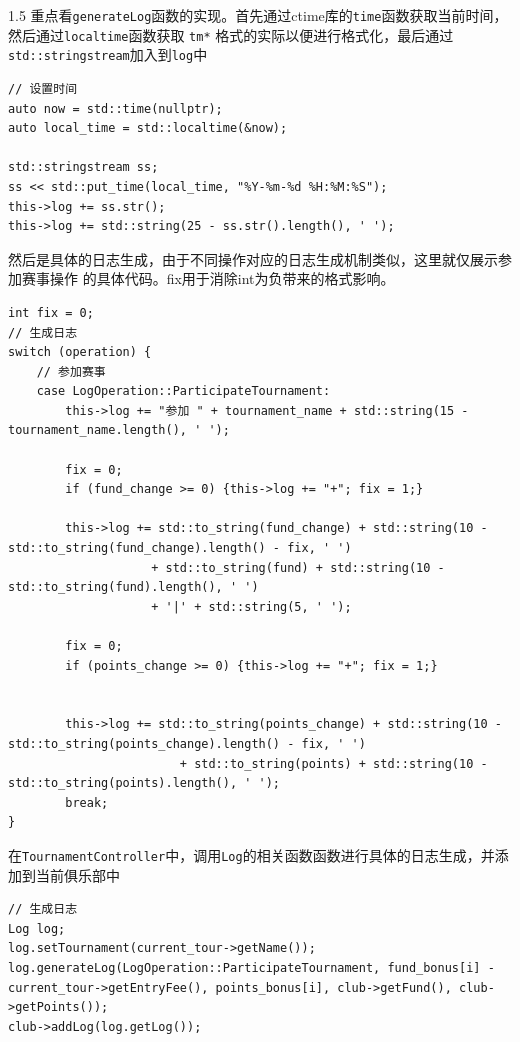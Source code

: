 \documentclass[a4paper]{article}
\begin{document}
\begin{spacing}{1.5}
    重点看\verb|generateLog|函数的实现。首先通过ctime库的\verb|time|函数获取当前时间，然后通过\verb|localtime|函数获取
    \verb|tm*| 格式的实际以便进行格式化，最后通过\verb|std::stringstream|加入到\verb|log|中

    \begin{lstlisting}[caption=时间戳生成]
// 设置时间
auto now = std::time(nullptr);
auto local_time = std::localtime(&now);

std::stringstream ss;
ss << std::put_time(local_time, "%Y-%m-%d %H:%M:%S");
this->log += ss.str();
this->log += std::string(25 - ss.str().length(), ' ');
    \end{lstlisting}

    然后是具体的日志生成，由于不同操作对应的日志生成机制类似，这里就仅展示参加赛事操作
    的具体代码。fix用于消除int为负带来的格式影响。

    \begin{lstlisting}[caption=日志生成]
int fix = 0;
// 生成日志
switch (operation) {
    // 参加赛事
    case LogOperation::ParticipateTournament:
        this->log += "参加 " + tournament_name + std::string(15 - tournament_name.length(), ' ');

        fix = 0;
        if (fund_change >= 0) {this->log += "+"; fix = 1;}
            
        this->log += std::to_string(fund_change) + std::string(10 - std::to_string(fund_change).length() - fix, ' ')
                    + std::to_string(fund) + std::string(10 - std::to_string(fund).length(), ' ')
                    + '|' + std::string(5, ' ');

        fix = 0;
        if (points_change >= 0) {this->log += "+"; fix = 1;}
            

        this->log += std::to_string(points_change) + std::string(10 - std::to_string(points_change).length() - fix, ' ')
                        + std::to_string(points) + std::string(10 - std::to_string(points).length(), ' ');
        break;
} 
    \end{lstlisting}

    在\verb|TournamentController|中，调用\verb|Log|的相关函数函数进行具体的日志生成，并添加到当前俱乐部中
    \begin{lstlisting}[caption=日志添加]
// 生成日志
Log log;
log.setTournament(current_tour->getName());
log.generateLog(LogOperation::ParticipateTournament, fund_bonus[i] - current_tour->getEntryFee(), points_bonus[i], club->getFund(), club->getPoints());
club->addLog(log.getLog());
    \end{lstlisting}


\end{spacing}
\end{document}
